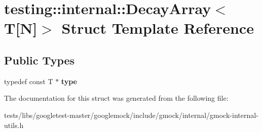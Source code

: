\hypertarget{structtesting_1_1internal_1_1DecayArray_3_01T[N]_4}{}\section{testing\+:\+:internal\+:\+:Decay\+Array$<$ T\mbox{[}N\mbox{]}$>$ Struct Template Reference}
\label{structtesting_1_1internal_1_1DecayArray_3_01T[N]_4}
\subsection*{Public Types}
\begin{DoxyCompactItemize}
\item 
\mbox{\label{structtesting_1_1internal_1_1DecayArray_3_01T[N]_4_afc22a88da484b94639501c07fb90bfd3}} 
typedef const T $\ast$ {\bfseries type}
\end{DoxyCompactItemize}


The documentation for this struct was generated from the following file\+:\begin{DoxyCompactItemize}
\item 
tests/libs/googletest-\/master/googlemock/include/gmock/internal/gmock-\/internal-\/utils.\+h\end{DoxyCompactItemize}
